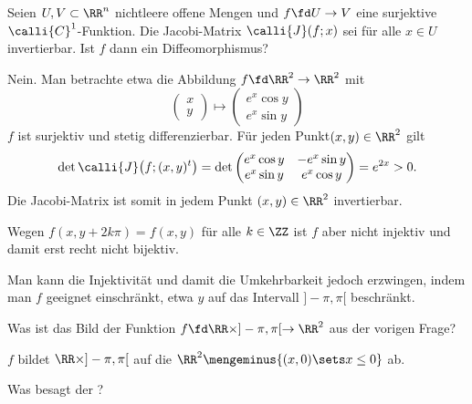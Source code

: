 \begin{frage}
  Seien $U,V \subset \RR^n$ nichtleere offene Mengen und $f\fd U\to V$ 
  eine surjektive $\calli{C}^1$-Funktion. 
  Die Jacobi-Matrix $\calli{J}(f;x)$ sei für alle $x\in U$ invertierbar. 
  Ist $f$ dann ein Diffeomorphismus?
\end{frage}

\begin{antwort}
  Nein. Man betrachte etwa die Abbildung $f\fd \RR^2 \to \RR^2$ mit 
  \[
  \begin{pmatrix} x \\ y \end{pmatrix} \mapsto 
  \begin{pmatrix} e^x \cos y \\ e^x \sin y \end{pmatrix} 
  \]
  $f$ ist surjektiv und stetig differenzierbar. Für jeden 
  Punkt$(x,y)\in \RR^2$ gilt  
  \[
  \det \calli{J} \big( f; (x,y)^t \big) = 
  \det \begin{pmatrix} 
    e^x \cos y &  -e^x \sin y \\ e^x \sin y & e^x \cos y
  \end{pmatrix} = e^{2x} > 0.
  \]
  Die Jacobi-Matrix ist somit in jedem Punkt $(x,y)\in \RR^2$ invertierbar. 

  Wegen $f(x,y+2k\pi)=f(x,y)$ für alle $k\in \ZZ$ ist $f$ aber nicht 
  injektiv und damit erst recht nicht bijektiv.

  Man kann die Injektivität und damit die Umkehrbarkeit jedoch 
  erzwingen, indem man $f$ geeignet einschränkt, etwa $y$ auf das 
  Intervall $]-\pi,\pi[$ beschränkt. \AntEnd
\end{antwort}

\begin{frage}
  Was ist das Bild der Funktion $f \fd \RR \times ]-\pi,\pi[ \to \RR^2$ 
  aus der vorigen Frage?
\end{frage}

\begin{antwort}
  $f$ bildet $\RR \times ]-\pi,\pi[$ auf die  
  $\RR^2 \mengeminus \{ (x,0)\sets x\le 0 \}$ ab. \AntEnd
\end{antwort}

\begin{frage}
  Was besagt der ?
\end{frage}

